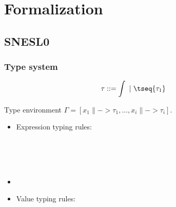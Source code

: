 
\chapter{Formalization}
\section{SNESL0}

\subsection{Type system}
$$\tau ::= \int \ | \ \tseq{\tau_1}$$

Type environment $\Gamma = [x_1 \|-> \tau_1, ..., x_i \|-> {\tau_i} ]$.
\begin{itemize}
	
	\item Expression typing rules:\\
	
	
	\\[1ex]
	
	
	\\[1ex]
	
	\\[2ex]
	
	
	\item {}
	
	\PT{\Axiom{\Typef{\iotan}{\int} {\tseq{\int}}}}
	\PT{\Axiom{\Typef{\plusn}{\int,\int} {\int}}}
	
	\item Value typing rules: \\
	
	
	
\end{itemize}

